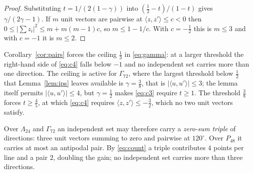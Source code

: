 \documentclass[11pt]{amsart}
\theoremstyle{remark}
\newcommand{\Leech}{\Lambda_{24}}
\newcommand{\Pff}{P_{48}}
\newcommand{\Gsz}{\Gamma_{72}}
\newcommand{\ip}[2]{\langle #1,#2\rangle}
\begin{document}
\begin{proof}
Substituting $t=1/(2(1-\gamma))$ into $(\tfrac12-t)/(1-t)$ gives
$\gamma/(2\gamma-1)$. If $m$ unit vectors are pairwise at $\ip{z}{z'}\le c<0$
then $0\le|\sum z_i|^2\le m+m(m-1)c$, so $m\le1-1/c$. With $c=-\tfrac12$ this
is $m\le3$ and with $c=-1$ it is $m\le2$.
\end{proof}

Corollary~\ref{cor:pairs} forces the ceiling $\tfrac13$ in \eqref{eq:gamma}: at a
larger threshold the right-hand side of \eqref{eq:c4} falls below $-1$ and no
independent set carries more than one direction. The ceiling is active for $\Gsz$,
where the largest threshold below $\tfrac12$ that Lemma~\ref{lem:ips} leaves
available is $\gamma=\tfrac38$, that is $|\ip{u}{u'}|\le3$; the lemma itself
permits $|\ip{u}{u'}|\le4$, but $\gamma=\tfrac12$ makes \eqref{eq:c3} require
$t\ge1$.
The threshold $\tfrac38$ forces $t\ge\tfrac45$, at which \eqref{eq:c4} requires
$\ip{z}{z'}\le-\tfrac32$, which no two unit vectors satisfy.

Over $\Leech$ and $\Gsz$ an independent set may therefore carry a \emph{zero-sum
triple} of directions: three unit vectors summing to zero and pairwise at
$120^\circ$. Over $\Pff$ it carries at most an antipodal pair. By
\eqref{eq:count} a triple contributes $4$ points per line and a pair $2$,
doubling the gain; no independent set carries more than three directions.
\end{document}
